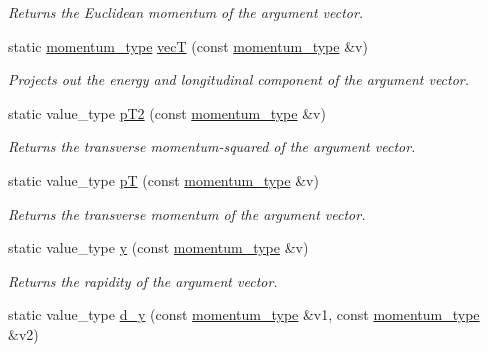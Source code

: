 \begin{DoxyCompactItemize}
\begin{DoxyCompactList}\small\item\em Returns the Euclidean momentum of the argument vector. \end{DoxyCompactList}\item 
\hypertarget{a00442_ab915e1ecc228419ee781937b8219c5a6}{static \hyperlink{a00559}{momentum\-\_\-type} \hyperlink{a00442_ab915e1ecc228419ee781937b8219c5a6}{vec\-T} (const \hyperlink{a00559}{momentum\-\_\-type} \&v)}\label{a00442_ab915e1ecc228419ee781937b8219c5a6}

\begin{DoxyCompactList}\small\item\em Projects out the energy and longitudinal component of the argument vector. \end{DoxyCompactList}\item 
\hypertarget{a00442_af03a3095af264195440bfd38e5fa306e}{static value\-\_\-type \hyperlink{a00442_af03a3095af264195440bfd38e5fa306e}{p\-T2} (const \hyperlink{a00559}{momentum\-\_\-type} \&v)}\label{a00442_af03a3095af264195440bfd38e5fa306e}

\begin{DoxyCompactList}\small\item\em Returns the transverse momentum-\/squared of the argument vector. \end{DoxyCompactList}\item 
\hypertarget{a00442_ad046f21ce16e6b3cb5c2547b2523639a}{static value\-\_\-type \hyperlink{a00442_ad046f21ce16e6b3cb5c2547b2523639a}{p\-T} (const \hyperlink{a00559}{momentum\-\_\-type} \&v)}\label{a00442_ad046f21ce16e6b3cb5c2547b2523639a}

\begin{DoxyCompactList}\small\item\em Returns the transverse momentum of the argument vector. \end{DoxyCompactList}\item 
\hypertarget{a00442_acb7928c8b021ee97341f8fed63e5ef00}{static value\-\_\-type \hyperlink{a00442_acb7928c8b021ee97341f8fed63e5ef00}{y} (const \hyperlink{a00559}{momentum\-\_\-type} \&v)}\label{a00442_acb7928c8b021ee97341f8fed63e5ef00}

\begin{DoxyCompactList}\small\item\em Returns the rapidity of the argument vector. \end{DoxyCompactList}\item 
\hypertarget{a00442_a9e228e7bb6e859a03ba0d3caf2802f7d}{static value\-\_\-type \hyperlink{a00442_a9e228e7bb6e859a03ba0d3caf2802f7d}{d\-\_\-y} (const \hyperlink{a00559}{momentum\-\_\-type} \&v1, const \hyperlink{a00559}{momentum\-\_\-type} \&v2)}\label{a00442_a9e228e7bb6e859a03ba0d3caf2802f7d}


\end{DoxyCompactItemize}
